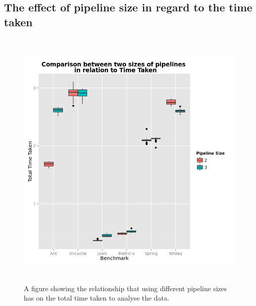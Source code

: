 \documentclass[11pt
              , a4paper
              , twoside
              , openright
              ]{report}
\begin{document}
 \newpage 
 \newpage \begin{appendices}
\chapter{The effect of pipeline size in regard to the time taken}
\begin{figure}[h]
\centering
\includegraphics[width=\textwidth,height=13cm]{PipelineTime.png}
\caption{A figure showing the relationship that using different pipeline sizes has on the total time taken to analyse the data.}
\label{fig:pipelinetime}
\end{figure}


\end{appendices}
\end{document}
